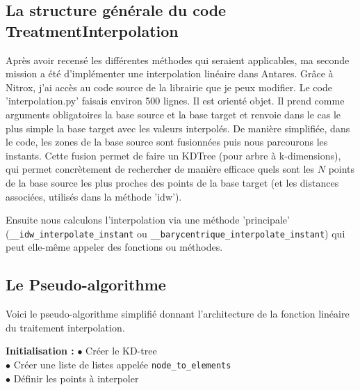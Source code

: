 \subsection{La structure générale du code TreatmentInterpolation}
Après avoir recensé les différentes méthodes qui seraient applicables, ma seconde mission a été d'implémenter une interpolation linéaire dans Antares. Grâce à Nitrox, j'ai accès au code source de la librairie que je peux modifier. Le code 'interpolation.py' faisais environ 500 lignes. Il est orienté objet. Il prend comme arguments obligatoires la base source et la base target et renvoie dans le cas le plus simple la base target avec les valeurs interpolés.
De manière simplifiée, dans le code, les zones de la base source sont fusionnées puis nous parcourons les instants. 
Cette fusion permet de faire un KDTree (pour arbre à k-dimensions), qui permet concrètement de rechercher de manière efficace quels sont les \( N \) points de la base source les plus proches des points de la base target (et les distances associées, utilisés dans la méthode 'idw').

Ensuite nous calculons l'interpolation via une méthode 'principale' (\lstinline{__idw_interpolate_instant} ou
\lstinline{__barycentrique_interpolate_instant}) qui peut elle-même appeler des fonctions ou méthodes.

\subsection{Le Pseudo-algorithme}



Voici le pseudo-algorithme simplifié donnant l'architecture de la fonction linéaire du traitement interpolation.

\vspace{0.5cm}

\textbf{Initialisation :}
$\bullet$ Créer le KD-tree\\
$\bullet$ Créer une liste de listes appelée \texttt{node\_to\_elements}\\
$\bullet$ Définir les points à interpoler\\


